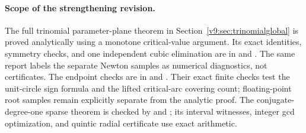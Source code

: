 \documentclass[UTF8,11pt]{ctexart}
\theoremstyle{definition}
\numberwithin{equation}{section}
\begin{document}
\paragraph{Scope of the strengthening revision.}
The full trinomial parameter-plane theorem in
Section~\ref{v9:sec:trinomialglobal} is proved analytically using a
monotone critical-value argument. Its exact identities, symmetry
checks, and one independent cubic elimination are in
 and
. The same report labels
the separate Newton samples as numerical diagnostics, not certificates.
The endpoint checks are in 
and . Their exact
finite checks test the unit-circle sign formula and the lifted
critical-arc covering count; floating-point root samples remain
explicitly separate from the analytic proof.
The conjugate-degree-one sparse theorem is checked by
 and
; its interval
witnesses, integer gcd optimization, and quintic radial certificate
use exact arithmetic.
\end{document}
